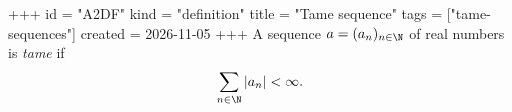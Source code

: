+++
id = "A2DF"
kind = "definition"
title = "Tame sequence"
tags = ["tame-sequences"]
created = 2026-11-05
+++
A sequence $a = (a_n)_{n \in \N}$ of real numbers is \emph{tame} if
\[
  \sum_{n \in \N} |a_n| < \infty.
\]
